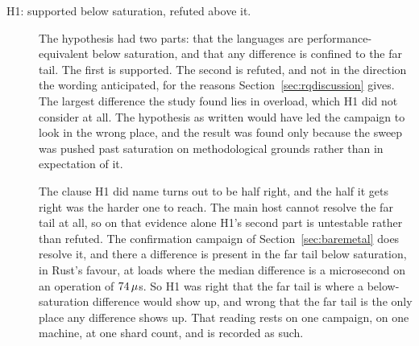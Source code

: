 \documentclass[english,oneside,a4paper,censored,csm,software-track-2020]{HYthesisML}
\begin{document}
\begin{description}
  \item[H1: supported below saturation, refuted above it.]
        The hypothesis had two parts: that the languages are performance-equivalent below
        saturation, and that any difference is confined to the far tail. The first is
        supported. The second is refuted, and not in the direction the wording anticipated,
        for the reasons Section~\ref{sec:rqdiscussion} gives. The largest difference the study
        found lies in overload, which H1 did not consider at all. The hypothesis as written would
        have led the campaign to look in the wrong place, and the result was found only because the
        sweep was pushed past saturation on methodological grounds rather than in expectation of it.

        The clause H1 did name turns out to be half right, and the half it gets right was the
        harder one to reach. The main host cannot resolve the far tail at all, so on that evidence
        alone H1's second part is untestable rather than refuted. The confirmation campaign of
        Section~\ref{sec:baremetal} does resolve it, and there a difference is present in the far
        tail below saturation, in Rust's favour, at loads where the median difference is a
        microsecond on an operation of $74\,\mu$s. So H1 was right that the far tail
        is where a below-saturation difference would show up, and wrong that the far tail is the
        only place any difference shows up. That reading rests on one campaign, on one machine, at
        one shard count, and is recorded as such.


\end{description}
\end{document}
